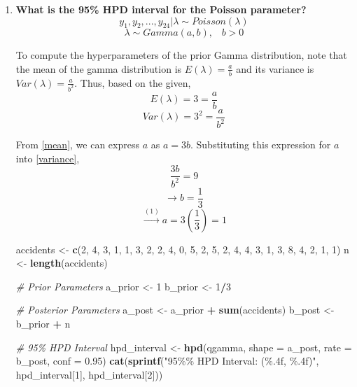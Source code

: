 \documentclass[]{article}
\newenvironment{Shaded}{\begin{snugshade}}{\end{snugshade}}
\newcommand{\AttributeTok}[1]{\textcolor[rgb]{0.13,0.29,0.53}{#1}}
\newcommand{\CommentTok}[1]{\textcolor[rgb]{0.56,0.35,0.01}{\textit{#1}}}
\newcommand{\DecValTok}[1]{\textcolor[rgb]{0.00,0.00,0.81}{#1}}
\newcommand{\FloatTok}[1]{\textcolor[rgb]{0.00,0.00,0.81}{#1}}
\newcommand{\FunctionTok}[1]{\textcolor[rgb]{0.13,0.29,0.53}{\textbf{#1}}}
\newcommand{\NormalTok}[1]{#1}
\newcommand{\OtherTok}[1]{\textcolor[rgb]{0.56,0.35,0.01}{#1}}
\newcommand{\SpecialCharTok}[1]{\textcolor[rgb]{0.81,0.36,0.00}{\textbf{#1}}}
\newcommand{\StringTok}[1]{\textcolor[rgb]{0.31,0.60,0.02}{#1}}
\begin{document}
\begin{enumerate}

\item \textbf{What is the 95\% HPD interval for the Poisson parameter?}
\hfill
\[
y_1,y_2,...,y_{24} | \lambda \sim Poisson(\lambda)
\]
\[
\lambda \sim Gamma(a,b),\;\;\; b>0
\]

To compute the hyperparameters of the prior Gamma distribution, note that the mean of the gamma distribution is $E(\lambda) = \frac{a}{b}$ and its variance is $Var(\lambda) = \frac{a}{b^2}$. Thus, based on the given, 
\[
E(\lambda) = 3 =\frac{a}{b} \tag{1} \label{mean}
\]
\[
Var(\lambda) = 3^2 = \frac{a}{b^2} \tag{2} \label{variance}
\]

From \eqref{mean}, we can express $a$ as $a = 3b$. Substituting this expression for $a$ into \eqref{variance},
\[
\frac{3b}{b^2} = 9
\]
\[
\rightarrow b = \frac{1}{3}
\]
\[
\xrightarrow{(1)} a = 3\left(\frac{1}{3}\right) = 1
\]
\begin{Shaded}
\begin{Highlighting}[]
\NormalTok{accidents }\OtherTok{\textless{}{-}} \FunctionTok{c}\NormalTok{(}\DecValTok{2}\NormalTok{, }\DecValTok{4}\NormalTok{, }\DecValTok{3}\NormalTok{, }\DecValTok{1}\NormalTok{, }\DecValTok{1}\NormalTok{, }\DecValTok{3}\NormalTok{, }\DecValTok{2}\NormalTok{, }\DecValTok{2}\NormalTok{, }\DecValTok{4}\NormalTok{, }\DecValTok{0}\NormalTok{, }\DecValTok{5}\NormalTok{, }\DecValTok{2}\NormalTok{, }\DecValTok{5}\NormalTok{, }\DecValTok{2}\NormalTok{, }\DecValTok{4}\NormalTok{, }\DecValTok{4}\NormalTok{, }\DecValTok{3}\NormalTok{, }\DecValTok{1}\NormalTok{, }\DecValTok{3}\NormalTok{, }\DecValTok{8}\NormalTok{, }
               \DecValTok{4}\NormalTok{, }\DecValTok{2}\NormalTok{, }\DecValTok{1}\NormalTok{, }\DecValTok{1}\NormalTok{)}
\NormalTok{n }\OtherTok{\textless{}{-}} \FunctionTok{length}\NormalTok{(accidents)}

\CommentTok{\# Prior Parameters}
\NormalTok{a\_prior }\OtherTok{\textless{}{-}} \DecValTok{1}
\NormalTok{b\_prior }\OtherTok{\textless{}{-}} \DecValTok{1}\SpecialCharTok{/}\DecValTok{3}

\CommentTok{\# Posterior Parameters}
\NormalTok{a\_post }\OtherTok{\textless{}{-}}\NormalTok{ a\_prior }\SpecialCharTok{+} \FunctionTok{sum}\NormalTok{(accidents)}
\NormalTok{b\_post }\OtherTok{\textless{}{-}}\NormalTok{ b\_prior }\SpecialCharTok{+}\NormalTok{ n }

\CommentTok{\# 95\% HPD Interval}
\NormalTok{hpd\_interval }\OtherTok{\textless{}{-}} \FunctionTok{hpd}\NormalTok{(qgamma, }\AttributeTok{shape =}\NormalTok{ a\_post, }\AttributeTok{rate =}\NormalTok{ b\_post, }\AttributeTok{conf =} \FloatTok{0.95}\NormalTok{)}
\FunctionTok{cat}\NormalTok{(}\FunctionTok{sprintf}\NormalTok{(}\StringTok{"95\%\% HPD Interval: (\%.4f, \%.4f)"}\NormalTok{, hpd\_interval[}\DecValTok{1}\NormalTok{],} 
              \NormalTok{hpd\_interval[}\DecValTok{2}\NormalTok{]))}
\end{Highlighting}
\end{Shaded}


\end{enumerate}
\end{document}
